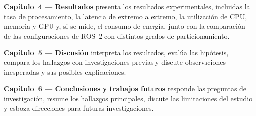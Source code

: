 \textbf{Capítulo~4 --- Resultados} presenta los resultados experimentales,
incluidas la tasa de procesamiento, la latencia de extremo a extremo, la
utilización de CPU, memoria y GPU y, si se mide, el consumo de energía,
junto con la comparación de las configuraciones de ROS~2 con distintos
grados de particionamiento.

\textbf{Capítulo~5 --- Discusión} interpreta los resultados, evalúa las
hipótesis, compara los hallazgos con investigaciones previas y discute
observaciones inesperadas y sus posibles explicaciones.

\textbf{Capítulo~6 --- Conclusiones y trabajos futuros} responde las
preguntas de investigación, resume los hallazgos principales, discute las
limitaciones del estudio y esboza direcciones para futuras investigaciones.

